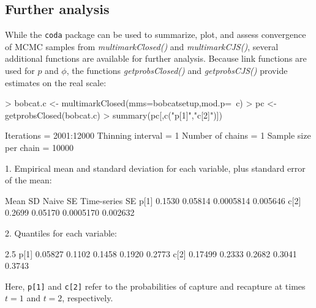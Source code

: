 \documentclass[12pt]{article}
\begin{document}
\subsection{Further analysis}
While the \verb|coda| package can be used to summarize, plot, and assess convergence of MCMC samples from \textit{multimarkClosed()} and \textit{multimarkCJS()}, several additional functions are available for further analysis. Because link functions are used for $p$ and $\phi$, the functions \textit{getprobsClosed()} and \textit{getprobsCJS()} provide estimates on the real scale:
\begin{Schunk}
\begin{Sinput}
> bobcat.c <- multimarkClosed(mms=bobcatsetup,mod.p=~c)
> pc <- getprobsClosed(bobcat.c)
> summary(pc[,c("p[1]","c[2]")])
\end{Sinput}
\begin{Soutput}
Iterations = 2001:12000
Thinning interval = 1 
Number of chains = 1 
Sample size per chain = 10000 

1. Empirical mean and standard deviation for each variable,
   plus standard error of the mean:

       Mean      SD  Naive SE Time-series SE
p[1] 0.1530 0.05814 0.0005814       0.005646
c[2] 0.2699 0.05170 0.0005170       0.002632

2. Quantiles for each variable:

        2.5%
p[1] 0.05827 0.1102 0.1458 0.1920 0.2773
c[2] 0.17499 0.2333 0.2682 0.3041 0.3743
\end{Soutput}
\end{Schunk}
Here, \verb|p[1]| and \verb|c[2]| refer to the probabilities of capture and recapture at times $t=1$ and $t=2$, respectively.
\end{document}
